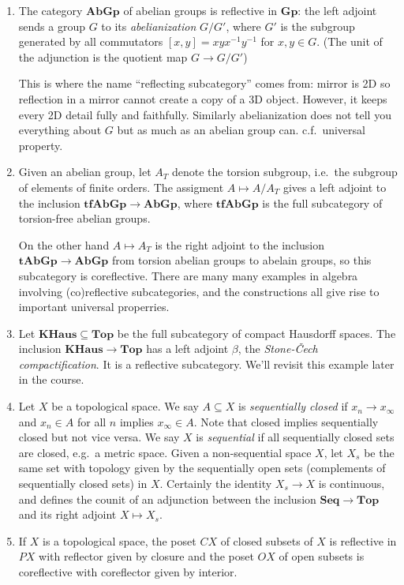 \documentclass[a4paper]{article}
\renewcommand{\c}[1]{\mathbf{#1}}
\newcommand{\Top}{{\c{Top}}}
\begin{document}
\begin{eg}\leavevmode
  \begin{enumerate}
  \item The category \(\c{AbGp}\) of abelian groups is reflective in \(\c{Gp}\): the left adjoint sends a group \(G\) to its \emph{abelianization} \(G/G'\), where \(G'\) is the subgroup generated by all commutators \([x, y] = xyx^{-1}y^{-1}\) for \(x, y \in G\). (The unit of the adjunction is the quotient map \(G \to G/G'\))

    This is where the name ``reflecting subcategory'' comes from: mirror is 2D so reflection in a mirror cannot create a copy of a 3D object. However, it keeps every 2D detail fully and faithfully. Similarly abelianization does not tell you everything about \(G\) but as much as an abelian group can. c.f.\ universal property.
  \item Given an abelian group, let \(A_T\) denote the torsion subgroup, i.e.\ the subgroup of elements of finite orders. The assigment \(A \mapsto A/A_T\) gives a left adjoint to the inclusion \(\c{tfAbGp} \to \c{AbGp}\), where \(\c{tfAbGp}\) is the full subcategory of torsion-free abelian groups.

    On the other hand \(A \mapsto A_T\) is the right adjoint to the inclusion \(\c{tAbGp} \to \c{AbGp}\) from torsion abelian groups to abelain groups, so this subcategory is coreflective. There are many many examples in algebra involving (co)reflective subcategories, and the constructions all give rise to important universal properries.
  \item Let \(\c{KHaus} \subseteq \Top\) be the full subcategory of compact Hausdorff spaces. The inclusion \(\c{KHaus} \to \Top\) has a left adjoint \(\beta\), the \emph{Stone-Čech compactification}. It is a reflective subcategory. We'll revisit this example later in the course.
  \item Let \(X\) be a topological space. We say \(A\subseteq X\) is \emph{sequentially closed} if \(x_n \to x_\infty\) and \(x_n \in A\) for all \(n\) implies \(x_\infty \in A\). Note that closed implies sequentially closed but not vice versa. We say \(X\) is \emph{sequential} if all sequentially closed sets are closed, e.g.\ a metric space. Given a non-sequential space \(X\), let \(X_s\) be the same set with topology given by the sequentially open sets (complements of sequentially closed sets) in \(X\). Certainly the identity \(X_s \to X\) is continuous, and defines the counit of an adjunction between the inclusion \(\c{Seq} \to \Top\) and its right adjoint \(X \mapsto X_s\).
  \item If \(X\) is a topological space, the poset \(CX\) of closed subsets of \(X\) is reflective in \(PX\) with reflector given by closure and the poset \(OX\) of open subsets is coreflective with coreflector given by interior.
  \end{enumerate}
\end{eg}
\end{document}
